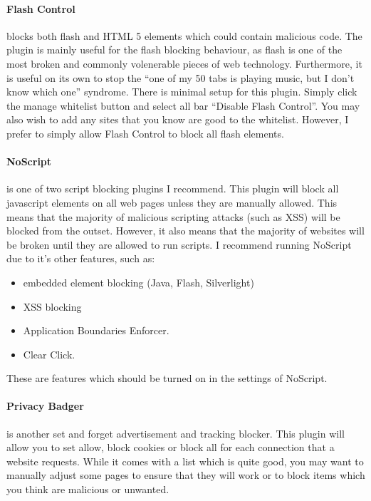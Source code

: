 \documentclass[a4paper,11pt]{article}
\begin{document}
		\paragraph{Flash Control}
			blocks both flash and HTML 5 elements which could contain malicious code. 
			The plugin is mainly useful for the flash blocking behaviour, as flash is one of the most broken and commonly volenerable pieces of web technology. 
			Furthermore, it is useful on its own to stop the ``one of my 50 tabs is playing music, but I don't know which one'' syndrome. 
			There is minimal setup for this plugin. Simply click the manage whitelist button and select all bar ``Disable Flash Control''. 
			You may also wish to add any sites that you know are good to the whitelist. 
			However, I prefer to simply allow Flash Control to block all flash elements. 
		\paragraph{NoScript}
			is one of two script blocking plugins I recommend. 
			This plugin will block all javascript elements on all web pages unless they are manually allowed. 
			This means that the majority of malicious scripting attacks (such as XSS) will be blocked from the outset. 
			However, it also means that the majority of websites will be broken until they are allowed to run scripts. 
			I recommend running NoScript due to it's other features, such as:
			\begin{itemize}
				\item embedded element blocking (Java, Flash, Silverlight) 
				\item XSS blocking
				\item Application Boundaries Enforcer. 
				\item Clear Click. 
			\end{itemize}
			These are features which should be turned on in the settings of NoScript. 
		\paragraph{Privacy Badger}
			is another set and forget advertisement and tracking blocker. 
			This plugin will allow you to set allow, block cookies or block all for each connection that a website requests. 
			While it comes with a list which is quite good, you may want to manually adjust some pages to ensure that they will work or to block items which you think are malicious or unwanted. 
\end{document}
